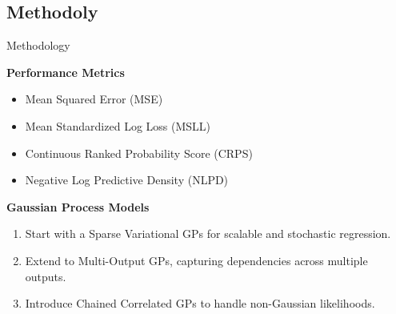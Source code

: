 \subsection{Methodoly}
\begin{frame}{Methodology}
	\justifying
	\begin{block}{\textbf{Performance Metrics}}
	\begin{itemize}
		\item Mean Squared Error (MSE)
		\item Mean Standardized Log Loss (MSLL)
		\item Continuous Ranked Probability Score (CRPS)
		\item Negative Log Predictive Density (NLPD)
	\end{itemize}
	\end{block}
	
	\begin{block}{\textbf{Gaussian Process Models}}
	\begin{enumerate}
		\item Start with a Sparse Variational GPs for scalable and stochastic regression.
		\item Extend to Multi-Output GPs, capturing dependencies across multiple outputs.
		\item Introduce Chained Correlated GPs to handle non-Gaussian likelihoods.
	\end{enumerate}
	\end{block}
\end{frame}
